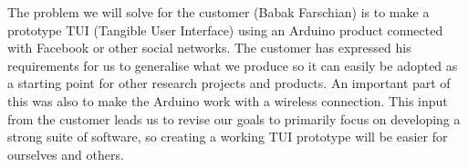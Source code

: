 The problem we will solve for the customer (Babak Farschian) is to
make a prototype TUI (Tangible User Interface) using an Arduino product
connected with Facebook or other social networks. The customer has
expressed his requirements for us to generalise what we produce so
it can easily be adopted as a starting point for other research projects
and products. An important part of this was also to make the Arduino
work with a wireless connection. This input from the customer leads
us to revise our goals to primarily focus on developing a strong suite
of software, so creating a working TUI prototype will be easier for
ourselves and others. 
